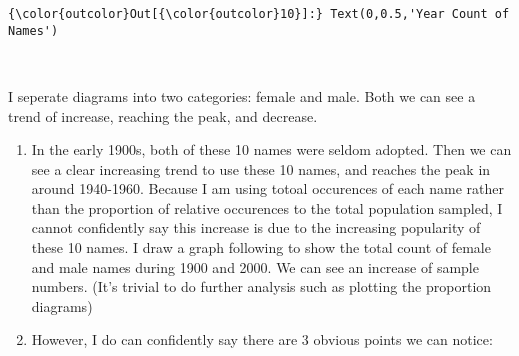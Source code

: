 \documentclass[11pt]{article}
\begin{document}
\begin{Verbatim}[commandchars=\\\{\}]
{\color{outcolor}Out[{\color{outcolor}10}]:} Text(0,0.5,'Year Count of Names')
\end{Verbatim}
            
    \begin{center}
    \end{center}
    { \hspace*{\fill} \\}
    
    I seperate diagrams into two categories: female and male. Both we can
see a trend of increase, reaching the peak, and decrease.

\begin{enumerate}
\def\labelenumi{\arabic{enumi}.}
\item
  In the early 1900s, both of these 10 names were seldom adopted. Then
  we can see a clear increasing trend to use these 10 names, and reaches
  the peak in around 1940-1960. Because I am using totoal occurences of
  each name rather than the proportion of relative occurences to the
  total population sampled, I cannot confidently say this increase is
  due to the increasing popularity of these 10 names. I draw a graph
  following to show the total count of female and male names during 1900
  and 2000. We can see an increase of sample numbers. (It's trivial to
  do further analysis such as plotting the proportion diagrams)
\item
  However, I do can confidently say there are 3 obvious points we can
  notice:


\end{enumerate}
\end{document}
